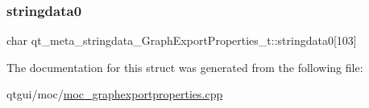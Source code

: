 \subsubsection{\texorpdfstring{stringdata0}{stringdata0}}
{\footnotesize\ttfamily char qt\+\_\+meta\+\_\+stringdata\+\_\+\+Graph\+Export\+Properties\+\_\+t\+::stringdata0\mbox{[}103\mbox{]}}



The documentation for this struct was generated from the following file\+:\begin{DoxyCompactItemize}
\item 
qtgui/moc/\mbox{\hyperlink{moc__graphexportproperties_8cpp}{moc\+\_\+graphexportproperties.\+cpp}}\end{DoxyCompactItemize}
